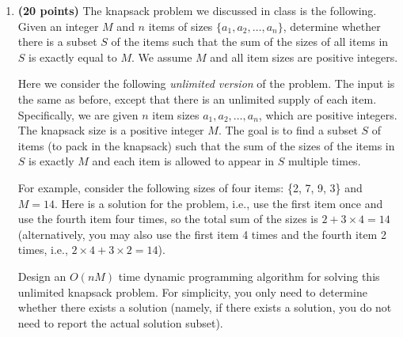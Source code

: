 \documentclass[11pt]{article}
\begin{document}
\begin{enumerate}

\item
{\bf (20 points)}
The knapsack problem we discussed in class is the following. Given
an integer $M$ and $n$ items of sizes $\{a_1, a_2, \ldots,
a_n\}$, determine whether there is a subset $S$ of the items such that the sum of the sizes of
all items in $S$ is exactly equal to $M$. We assume $M$ and all item sizes are positive integers.

Here we consider the following {\em unlimited version} of the problem. The
input is the same as before, except that there is an unlimited supply of each item. Specifically, we are given $n$ item sizes $a_1,a_2,\ldots,a_n$, which are positive integers.
The knapsack size is a positive integer $M$. The goal is to find a subset $S$ of items (to pack in the knapsack) such that the sum of the sizes of the items in $S$ is exactly $M$ and
each item is allowed to appear in $S$ multiple times.


For example, consider the following sizes of four items: \{2, 7, 9, 3\} and $M=14$. Here is a solution for the problem, i.e., use the first item once and use the fourth item four times, so the total sum of the sizes is $2+3\times 4=14$ (alternatively, you may also use the first item 4 times and the fourth item 2 times, i.e., $2\times 4 + 3\times 2=14$).

Design an $O(nM)$ time dynamic programming algorithm for solving this unlimited
knapsack problem. For simplicity, you only need to determine whether
there exists a solution (namely, if
there exists a solution, you do not need to report the actual solution subset).


\end{enumerate}
\end{document}
